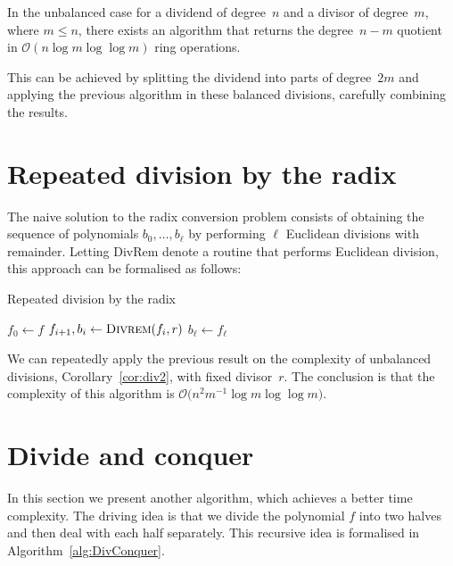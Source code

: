 \begin{cor} \label{cor:div2}
In the unbalanced case for a dividend of degree~$n$ and 
a divisor of degree~$m$, where $m \leq n$, there exists an 
algorithm that returns the degree~\mbox{$n-m$} quotient in 
$\mathcal{O}(n \log m \log \log m)$ ring operations.
\end{cor}

This can be achieved by splitting the dividend into parts of degree~$2m$ 
and applying the previous algorithm in these balanced divisions, carefully 
combining the results.


\section{Repeated division by the radix}

The naive solution to the radix conversion problem consists of 
obtaining the sequence of polynomials $b_0, \dotsc, b_{\ell}$ 
by performing $\ell$ Euclidean divisions with remainder.  Letting 
{\sc DivRem} denote a routine that performs Euclidean division, 
this approach can be formalised as follows:

\begin{algorithm}[H]
\caption{Repeated division by the radix}
\label{alg:RepeatedDivision}
\begin{algorithmic}
\vspace{1mm}
\State $f_0 \gets f$
\State $f_{i+1}, b_i \gets \Call{Divrem}{f_i, r}$
\EndFor
\State $b_{\ell} \gets f_{\ell}$
\EndProcedure
\end{algorithmic}
\end{algorithm}

We can repeatedly apply the previous result on the complexity 
of unbalanced divisions, Corollary~\ref{cor:div2}, with fixed 
divisor~$r$.  The conclusion is that the complexity of this 
algorithm is $\mathcal{O} \bigl( n^2 m^{-1} \log m \log \log m \bigr)$.


\section{Divide and conquer}

In this section we present another algorithm, which achieves 
a better time complexity.  The driving idea is that we divide 
the polynomial $f$ into two halves and then deal with each half 
separately.  This recursive idea is formalised in 
Algorithm~\ref{alg:DivConquer}.

